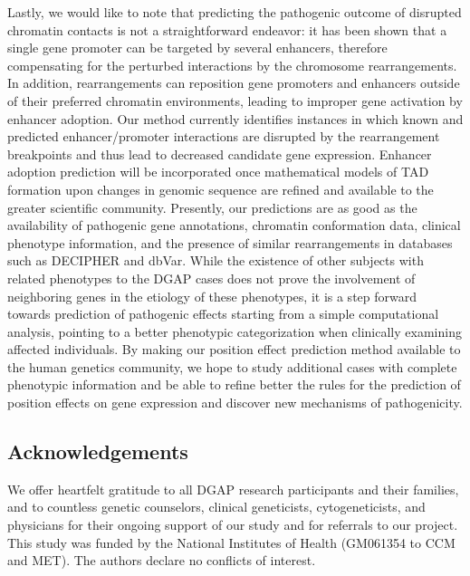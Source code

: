 \documentclass[a4paper,twoside=true,openright,parskip=full,chapterprefix=true,11pt,headings=normal,bibliography=totoc,listof=totoc,titlepage=on,captions=tableabove,draft=false]{scrreprt}
\theoremstyle{definition}
\theoremstyle{definition}
\theoremstyle{definition}
\theoremstyle{remark}
\begin{document}
Lastly, we would like to note that predicting the pathogenic outcome of
disrupted chromatin contacts is not a straightforward endeavor: it has
been shown that a single gene promoter can be targeted by several
enhancers,\citep{Thurman2012} therefore compensating for the perturbed
interactions by the chromosome rearrangements. In addition,
rearrangements can reposition gene promoters and enhancers outside of
their preferred chromatin environments, leading to improper gene
activation by enhancer adoption.\citep{Lupianez2015} Our method
currently identifies instances in which known and predicted
enhancer/promoter interactions are disrupted by the rearrangement
breakpoints and thus lead to decreased candidate gene expression.
Enhancer adoption prediction will be incorporated once mathematical
models of TAD formation upon changes in genomic sequence are refined and
available to the greater scientific community. Presently, our
predictions are as good as the availability of pathogenic gene
annotations, chromatin conformation data, clinical phenotype
information, and the presence of similar rearrangements in databases
such as DECIPHER and dbVar. While the existence of other subjects with
related phenotypes to the DGAP cases does not prove the involvement of
neighboring genes in the etiology of these phenotypes, it is a step
forward towards prediction of pathogenic effects starting from a simple
computational analysis, pointing to a better phenotypic categorization
when clinically examining affected individuals. By making our position
effect prediction method available to the human genetics community, we
hope to study additional cases with complete phenotypic information and
be able to refine better the rules for the prediction of position
effects on gene expression and discover new mechanisms of pathogenicity.

\hypertarget{acknowledgements-1}{%
\subsection*{Acknowledgements}\label{acknowledgements-1}}

We offer heartfelt gratitude to all DGAP research participants and their
families, and to countless genetic counselors, clinical geneticists,
cytogeneticists, and physicians for their ongoing support of our study
and for referrals to our project. This study was funded by the National
Institutes of Health (GM061354 to CCM and MET). The authors declare no
conflicts of interest.
\end{document}
